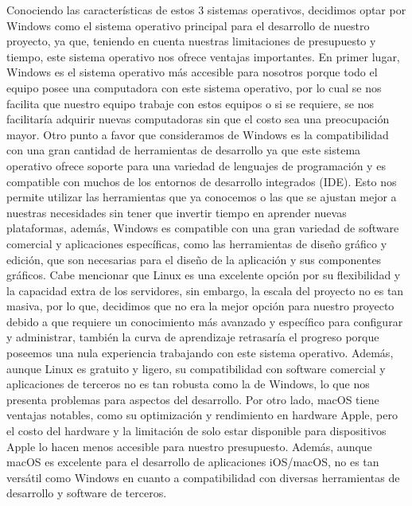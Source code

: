 Conociendo las características de estos 3 sistemas operativos, decidimos optar por Windows como el sistema operativo principal para el desarrollo de nuestro proyecto, ya que, teniendo en cuenta nuestras limitaciones de presupuesto y tiempo, este sistema operativo nos ofrece ventajas importantes. En primer lugar, Windows es el sistema operativo más accesible para nosotros porque todo el equipo posee una computadora con este sistema operativo, por lo cual se nos facilita que nuestro equipo trabaje con estos equipos o si se requiere, se nos facilitaría adquirir nuevas computadoras sin que el costo sea una preocupación mayor.
Otro punto a favor que consideramos de Windows es la compatibilidad con una gran cantidad de herramientas de desarrollo ya que este sistema operativo ofrece soporte para una variedad de lenguajes de programación y es compatible con muchos de los entornos de desarrollo integrados (IDE). Esto nos permite utilizar las herramientas que ya conocemos o las que se ajustan mejor a nuestras necesidades sin tener que invertir tiempo en aprender nuevas plataformas, además, Windows es compatible con una gran variedad de software comercial y aplicaciones específicas, como las herramientas de diseño gráfico y edición, que son necesarias para el diseño de la aplicación y sus componentes gráficos.
Cabe mencionar que Linux es una excelente opción por su flexibilidad y la capacidad extra de los servidores, sin embargo, la escala del proyecto no es tan masiva, por lo que, decidimos que no era la mejor opción para nuestro proyecto debido a que requiere un conocimiento más avanzado y específico para configurar y administrar, también la curva de aprendizaje retrasaría el progreso porque poseemos una nula experiencia trabajando con este sistema operativo. Además, aunque Linux es gratuito y ligero, su compatibilidad con software comercial y aplicaciones de terceros no es tan robusta como la de Windows, lo que nos presenta problemas para aspectos del desarrollo.
Por otro lado, macOS tiene ventajas notables, como su optimización y rendimiento en hardware Apple, pero el costo del hardware y la limitación de solo estar disponible para dispositivos Apple lo hacen menos accesible para nuestro presupuesto. Además, aunque macOS es excelente para el desarrollo de aplicaciones iOS/macOS, no es tan versátil como Windows en cuanto a compatibilidad con diversas herramientas de desarrollo y software de terceros.

